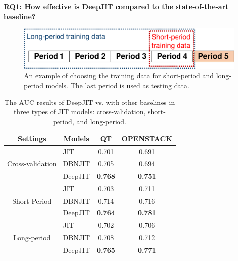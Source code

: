 \noindent \textbf{RQ1: How effective is DeepJIT compared to the state-of-the-art baseline?}

\begin{figure}
	\center
	\includegraphics[scale=0.4]{figs/split.pdf}
	\caption{An example of choosing the training data for short-period and long-period models. The last period is used as testing data.}
	\label{fig:splitting}
\end{figure}

\begin{table}[ht]
  \centering
  \caption{The AUC results of DeepJIT vs. with other baselines in three types of JIT models: cross-validation, short-period, and long-period.}
    \begin{tabular}{|c|l|c|c|}
    \hline
    \textbf{Settings} & \multicolumn{1}{c|}{\textbf{Models}} & QT & OPENSTACK \\
    \hline
    \hline
    \multirow{3}[6]{*}{Cross-validation} & JIT   & 0.701 & 0.691 \\
\cline{2-4}          & DBNJIT & 0.705 & 0.694 \\
\cline{2-4}          & DeepJIT & \textbf{0.768} & \textbf{0.751} \\
    \hline
    \multirow{3}[6]{*}{Short-Period} & JIT   & 0.703 & 0.711 \\
\cline{2-4}          & DBNJIT & 0.714 & 0.716 \\
\cline{2-4}          & DeepJIT & \textbf{0.764} & \textbf{0.781} \\
    \hline
    \multirow{3}[6]{*}{Long-period} & JIT   & 0.702 & 0.706 \\
\cline{2-4}          & DBNJIT & 0.708 & 0.712 \\
\cline{2-4}          & DeepJIT & \textbf{0.765} & \textbf{0.771} \\
    \hline
    \end{tabular}%
  \label{tab:results}%
\end{table}%

